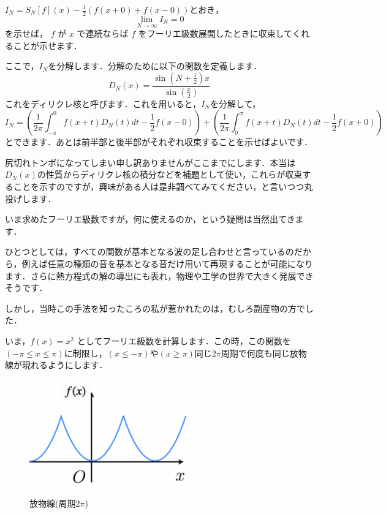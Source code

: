 $I_N = S_N[f](x) - \frac{1}{2}(f(x+0)+f(x-0))$とおき，
\[
  \lim_{N \to \infty} I_N = 0
\]
を示せば， $f$ が $x$ で連続ならば $f$ をフーリエ級数展開したときに収束してくれることが示せます．

ここで，$I_N$を分解します．分解のために以下の関数を定義します．
\[D_N(x) = \frac{\sin(N + \frac{1}{2})x}{\sin(\frac{x}{2})}\]
これをディリクレ核と呼びます．これを用いると，$I_N$を分解して，
\[
  I_N = (\frac{1}{2\pi} \int_{-\pi}^0 f(x+t) D_N(t) dt - \frac{1}{2} f(x-0)) +  (\frac{1}{2\pi} \int_0^\pi f(x+t) D_N(t) dt - \frac{1}{2} f(x+0))
\]
とできます．あとは前半部と後半部がそれぞれ収束することを示せばよいです．

尻切れトンボになってしまい申し訳ありませんがここまでにします．本当は$D_N(x)$の性質からディリクレ核の積分などを補題として使い，これらが収束することを示すのですが，興味がある人は是非調べてみてください，と言いつつ丸投げします．

いま求めたフーリエ級数ですが，何に使えるのか，という疑問は当然出てきます．

ひとつとしては，すべての関数が基本となる波の足し合わせと言っているのだから，例えば任意の種類の音を基本となる音だけ用いて再現することが可能になります．さらに熱方程式の解の導出にも表れ，物理や工学の世界で大きく発展できそうです．

しかし，当時この手法を知ったころの私が惹かれたのは，むしろ副産物の方でした．

いま，$f(x) = x^2$ としてフーリエ級数を計算します．この時，この関数を$({-\pi} \leq x \leq \pi)$に制限し，$(x \leq -\pi)$や$(x \geq \pi)$同じ${2\pi}$周期で何度も同じ放物線が現れるようにします．

\begin{figure}[h]
  \begin{center}
    \includegraphics[clip,width=7.0cm]{osawa.png}
    \caption{放物線(周期$2\pi$)}
    \label{f_para}
  \end{center}
\end{figure}

